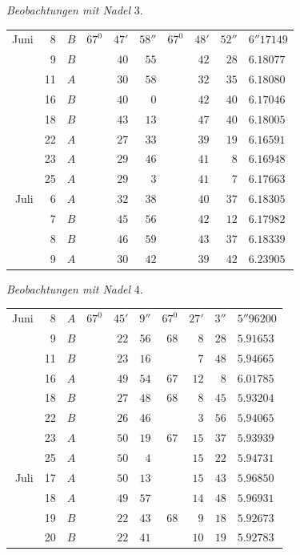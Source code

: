 \begin{center}
\textit{Beobachtungen mit Nadel} 3.

\begin{tabular}{rr|c|rrr|rrr|l}
Juni&8&$B$&$67^0$&$47'$&$58''$&$67^0$&$48'$&$52''$&$6''17149$\\
&9&$B$&&$40$&$55$&&$42$&$28$&$6.18077$\\
&11&$A$&&$30$&$58$&&$32$&$35$&$6.18080$\\
&16&$B$&&$40$&$0$&&$42$&$40$&$6.17046$\\
&18&$B$&&$43$&$13$&&$47$&$40$&$6.18005$\\
&22&$A$&&$27$&$33$&&$39$&$19$&$6.16591$\\
&23&$A$&&$29$&$46$&&$41$&$8$&$6.16948$\\
&25&$A$&&$29$&$3$&&$41$&$7$&$6.17663$\\
Juli&6&$A$&&$32$&$38$&&$40$&$37$&$6.18305$\\
&7&$B$&&$45$&$56$&&$42$&$12$&$6.17982$\\
&8&$B$&&$46$&$59$&&$43$&$37$&$6.18339$\\
&9&$A$&&$30$&$42$&&$39$&$42$&$6.23905$
\end{tabular}
\end{center}

\begin{center}
\textit{Beobachtungen mit Nadel} 4.

\begin{tabular}{rr|c|rrr|rrr|l}
Juni&8&$A$&$67^0$&$45'$&$9''$&$67^0$&$27'$&$3''$&$5''96200$\\
&9&$B$&&$22$&$56$&$68$&$8$&$28$&$5.91653$\\
&11&$B$&&$23$&$16$&&$7$&$48$&$5.94665$\\
&16&$A$&&$49$&$54$&$67$&$12$&$8$&$6.01785$\\
&18&$B$&&$27$&$48$&$68$&$8$&$45$&$5.93204$\\
&22&$B$&&$26$&$46$&&$3$&$56$&$5.94065$\\
&23&$A$&&$50$&$19$&$67$&$15$&$37$&$5.93939$\\
&25&$A$&&$50$&$4$&&$15$&$22$&$5.94731$\\
Juli&17&$A$&&$50$&$13$&&$15$&$43$&$5.96850$\\
&18&$A$&&$49$&$57$&&$14$&$48$&$5.96931$\\
&19&$B$&&$22$&$43$&$68$&$9$&$18$&$5.92673$\\
&20&$B$&&$22$&$41$&&$10$&$19$&$5.92783$
\end{tabular}
\end{center}


